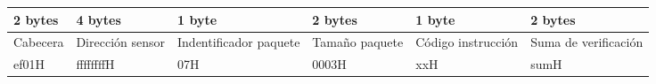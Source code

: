 \small
\begin{tabular}{|C{1.6cm}|C{1.6cm}|C{2.1cm}|C{1.6cm}|C{1.6cm}|C{2.1cm}|}
   bytes & 4 bytes & 1 byte & 2 bytes & 1 byte & 2 bytes \\
  \hline
  Cabecera & Dirección sensor & Indentificador paquete & Tamaño paquete & Código instrucción & Suma de verificación \\
  \hline
  ef01H & ffffffffH & 07H & 0003H & xxH & sumH \\
  \hline
\end{tabular}